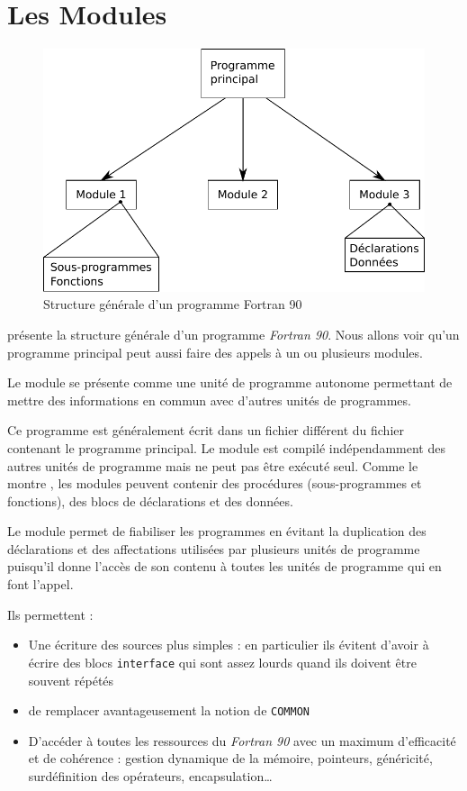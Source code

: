 \documentclass[a4paper,twoside]{article}
\begin{document}

\section{Les Modules}

\begin{figure}[htb]
\centering
\includegraphics[width=0.65\linewidth]{figure/structure_programme.pdf}
\caption{Structure générale d'un programme Fortran 90}\label{fig:structure_programme}
\end{figure}

 présente la structure générale d'un programme \emph{Fortran 90}. Nous allons voir qu'un programme principal peut aussi faire des appels à un ou plusieurs modules. 

\begin{definition}
Le module se présente comme une unité de programme autonome permettant de mettre des informations en commun avec d'autres unités de programmes. 
\end{definition}


Ce programme est généralement écrit dans un fichier différent du fichier contenant le programme principal. Le module est compilé indépendamment des autres unités de programme mais ne peut pas être exécuté seul. Comme le montre , les modules peuvent contenir des procédures (sous-programmes et fonctions), des blocs de déclarations et des données. 

Le module permet de fiabiliser les programmes en évitant la duplication des déclarations et des affectations utilisées par plusieurs unités de programme puisqu'il donne l'accès de son contenu à toutes les unités de programme qui en font l'appel.

Ils permettent : 
\begin{itemize}
\item Une écriture des sources plus simples : en particulier ils évitent d'avoir à écrire des blocs \texttt{interface} qui sont assez lourds quand ils doivent être souvent répétés
\item de remplacer avantageusement la notion de \texttt{COMMON}
\item D'accéder à toutes les ressources du \emph{Fortran 90} avec un maximum d'efficacité et de cohérence : gestion dynamique de la mémoire, pointeurs, généricité, surdéfinition des opérateurs, encapsulation\dots
\end{itemize}
\end{document}
